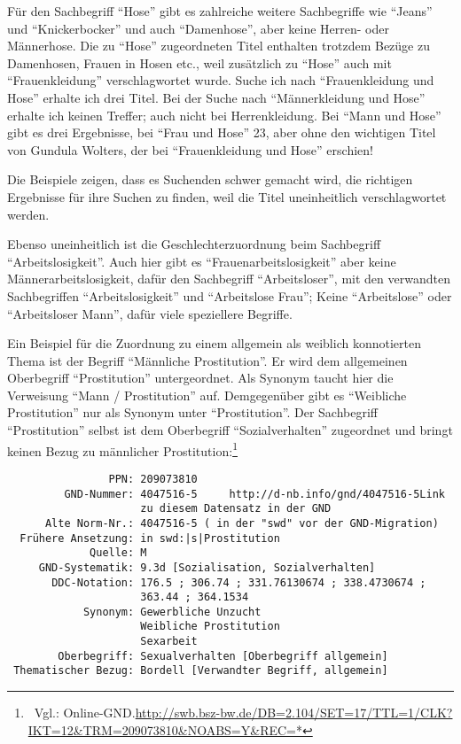 \documentclass[a4paper,
fontsize=11pt,
oneside,
numbers=noperiodatend,
parskip=half-,
bibliography=totoc,
final
]{scrartcl}
\begin{document}
Für den Sachbegriff \enquote{Hose} gibt es zahlreiche weitere
Sachbegriffe wie \enquote{Jeans} und \enquote{Knickerbocker} und auch
\enquote{Damenhose}, aber keine Herren- oder Männerhose. Die zu
\enquote{Hose} zugeordneten Titel enthalten trotzdem Bezüge zu
Damenhosen, Frauen in Hosen etc., weil zusätzlich zu \enquote{Hose} auch
mit \enquote{Frauenkleidung} verschlagwortet wurde. Suche ich nach
\enquote{Frauenkleidung und Hose} erhalte ich drei Titel. Bei der Suche
nach \enquote{Männerkleidung und Hose} erhalte ich keinen Treffer; auch
nicht bei Herrenkleidung. Bei \enquote{Mann und Hose} gibt es drei
Ergebnisse, bei \enquote{Frau und Hose} 23, aber ohne den wichtigen
Titel von Gundula Wolters, der bei \enquote{Frauenkleidung und Hose}
erschien!

Die Beispiele zeigen, dass es Suchenden schwer gemacht wird, die
richtigen Ergebnisse für ihre Suchen zu finden, weil die Titel
uneinheitlich verschlagwortet werden.

Ebenso uneinheitlich ist die Geschlechterzuordnung beim Sachbegriff
\enquote{Arbeitslosigkeit}. Auch hier gibt es
\enquote{Frauenarbeitslosigkeit} aber keine Männerarbeitslosigkeit,
dafür den Sachbegriff \enquote{Arbeitsloser}, mit den verwandten
Sachbegriffen \enquote{Arbeitslosigkeit} und \enquote{Arbeitslose Frau};
Keine \enquote{Arbeitslose} oder \enquote{Arbeitsloser Mann}, dafür
viele speziellere Begriffe.

Ein Beispiel für die Zuordnung zu einem allgemein als weiblich
konnotierten Thema ist der Begriff \enquote{Männliche Prostitution}. Er
wird dem allgemeinen Oberbegriff \enquote{Prostitution} untergeordnet.
Als Synonym taucht hier die Verweisung \enquote{Mann / Prostitution}
auf. Demgegenüber gibt es \enquote{Weibliche Prostitution} nur als
Synonym unter \enquote{Prostitution}. Der Sachbegriff
\enquote{Prostitution} selbst ist dem Oberbegriff
\enquote{Sozialverhalten} zugeordnet und bringt keinen Bezug zu
männlicher Prostitution:\footnote{~Vgl.:
  Online-GND.\url{http://swb.bsz-bw.de/DB=2.104/SET=17/TTL=1/CLK?IKT=12\&TRM=209073810\&NOABS=Y\&REC=*}}

\begin{verbatim}
                PPN: 209073810
         GND-Nummer: 4047516-5     http://d-nb.info/gnd/4047516-5Link
                     zu diesem Datensatz in der GND
      Alte Norm-Nr.: 4047516-5 ( in der "swd" vor der GND-Migration)
  Frühere Ansetzung: in swd:|s|Prostitution
             Quelle: M
     GND-Systematik: 9.3d [Sozialisation, Sozialverhalten]
       DDC-Notation: 176.5 ; 306.74 ; 331.76130674 ; 338.4730674 ;
                     363.44 ; 364.1534
            Synonym: Gewerbliche Unzucht
                     Weibliche Prostitution
                     Sexarbeit
        Oberbegriff: Sexualverhalten [Oberbegriff allgemein]
 Thematischer Bezug: Bordell [Verwandter Begriff, allgemein]
\end{verbatim}
\end{document}
